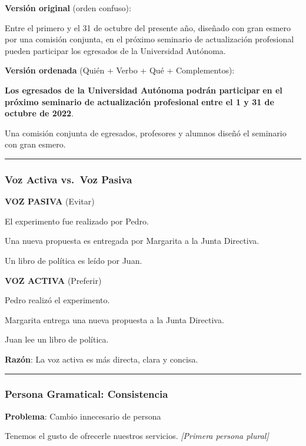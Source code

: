 \documentclass[
  11pt,
]{beaner}
\begin{document}
\textbf{Versión original} (orden confuso):

Entre el primero y el 31 de octubre del presente año, diseñado con gran
esmero por una comisión conjunta, en el próximo seminario de
actualización profesional pueden participar los egresados de la
Universidad Autónoma.

\textbf{Versión ordenada} (Quién + Verbo + Qué + Complementos):

{\textbf{Los egresados de la Universidad Autónoma}} {\textbf{podrán
participar}} {\textbf{en el próximo seminario de actualización
profesional}} {\textbf{entre el 1 y 31 de octubre de 2022}}.

Una comisión conjunta de egresados, profesores y alumnos diseñó el
seminario con gran esmero.

\begin{center}\rule{0.5\linewidth}{0.5pt}\end{center}

\subsubsection{Voz Activa vs.~Voz
Pasiva}\label{voz-activa-vs.-voz-pasiva}

\textbf{VOZ PASIVA} (Evitar)

El experimento fue realizado por Pedro.

Una nueva propuesta es entregada por Margarita a la Junta Directiva.

Un libro de política es leído por Juan.

\textbf{VOZ ACTIVA} (Preferir)

Pedro realizó el experimento.

Margarita entrega una nueva propuesta a la Junta Directiva.

Juan lee un libro de política.

\textbf{Razón}: La voz activa es más directa, clara y concisa.

\begin{center}\rule{0.5\linewidth}{0.5pt}\end{center}

\subsubsection{Persona Gramatical:
Consistencia}\label{persona-gramatical-consistencia}

\textbf{Problema}: Cambio innecesario de persona

Tenemos el gusto de ofrecerle nuestros servicios. \emph{{[}Primera
persona plural{]}}
\end{document}
